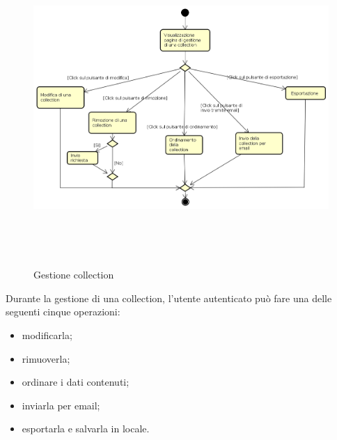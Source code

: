\begin{figure}[H]
\begin{center}
\includegraphics[height=12cm]{res/sections/backend/activities/gestioneCollection.png}
\caption{Gestione collection}
\end{center}
\end{figure}
Durante la gestione di una collection, l'utente autenticato può fare una delle seguenti cinque operazioni:
\begin{itemize}
\item modificarla;
\item rimuoverla;
\item ordinare i dati contenuti;
\item inviarla per email;
\item esportarla e salvarla in locale.
\end{itemize}
